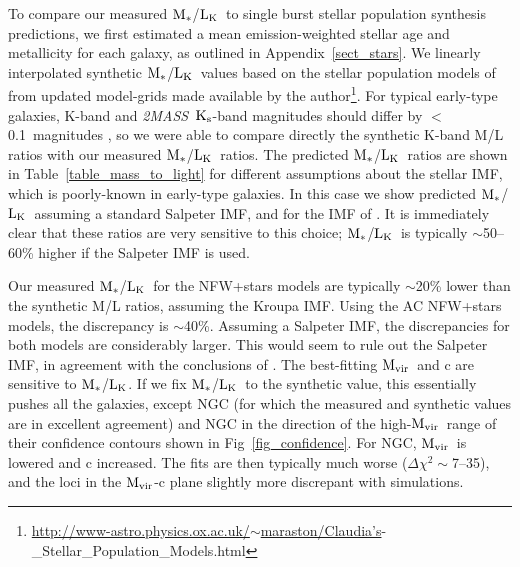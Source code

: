 \documentclass{emulateapj}
\newcommand{\mvir}{${\rm M_{vir}}$}
\newcommand{\mstars}{${\rm M_{*}}$}
\newcommand{\lk }{${\rm L_K}$}
\newcommand{\ks }{${\rm K_s}$}
\newcommand{\twomass}{{\em 2MASS}}
\newcommand{\thin}{\thinspace}
\begin{document}
To compare our measured \mstars/\lk\ to single burst stellar population synthesis
predictions, we first estimated a mean emission-weighted
stellar age and metallicity for each galaxy, as 
outlined in Appendix~\ref{sect_stars}.
We linearly interpolated synthetic \mstars/\lk\ values based on
the stellar population models of \citet{maraston98a} from
updated model-grids made available by the author\footnote{\href{http://www-astro.physics.ox.ac.uk/~maraston/Claudia's_Stellar_Population_Models.html}{http://www-astro.physics.ox.ac.uk/$\sim$maraston/Claudia's}-\\\_Stellar\_Population\_Models.html}.
For typical early-type galaxies, K-band and 
\twomass\ \ks-band magnitudes should
differ by $<$0.1~magnitudes \citep{carpenter01a}, so we were
able to compare directly the synthetic K-band M/L ratios with
our measured \mstars/\lk\ ratios.
The predicted \mstars/\lk\
ratios are shown in Table~\ref{table_mass_to_light} for different
assumptions about the stellar IMF, which is poorly-known in 
early-type galaxies. In this case we show predicted \mstars/\lk\ assuming
a standard Salpeter IMF, and for the IMF of \citet{kroupa01a}.
It is immediately clear that these ratios
are very sensitive to this choice; \mstars/\lk\ is typically
$\sim$50--60\% higher if the Salpeter IMF is used. 


Our measured \mstars/\lk\ for the NFW+stars models are typically
$\sim$20\% lower than the synthetic M/L ratios, assuming the 
Kroupa IMF. Using the AC NFW+stars models, the discrepancy is $\sim$40\%.
Assuming a Salpeter IMF, the discrepancies for both models
are considerably larger. This would seem to rule out the 
Salpeter IMF, in agreement with the conclusions of 
\citet{padmanabhan04a}. 
The best-fitting \mvir\ and c are sensitive to
\mstars/\lk. If we fix \mstars/\lk\ to the synthetic value, this 
essentially pushes all the galaxies, except NGC\thin 4261 (for which
the measured and synthetic values are in excellent agreement) and 
NGC\thin 720 in the direction of  the high-\mvir\ range of their 
confidence contours shown in Fig~\ref{fig_confidence}. 
For NGC\thin 720, \mvir\ is lowered and c increased. The 
fits are then typically much worse ($\Delta \chi^2 \sim$7--35),
and the loci in the \mvir-c plane slightly more discrepant with 
simulations.
\end{document}
